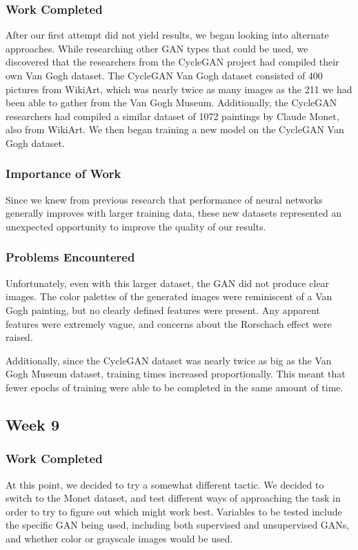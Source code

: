 \documentclass[12pt,letterpaper]{article}
\begin{document}
			\subsubsection{Work Completed}
				After our first attempt did not yield results, we began looking into alternate approaches.
				While researching other GAN types that could be used, we discovered that the researchers from the CycleGAN\cite{CycleGAN2017}\cite{isola2017image} project had compiled their own Van Gogh dataset.
				The CycleGAN Van Gogh dataset consisted of 400 pictures from WikiArt\cite{wikiartVanGogh}, which was nearly twice as many images as the 211 we had been able to gather from the Van Gogh Museum.
				Additionally, the CycleGAN researchers had compiled a similar dataset of 1072 paintings by Claude Monet, also from WikiArt.
				We then began training a new model on the CycleGAN Van Gogh dataset.
			\subsubsection{Importance of Work}
				Since we knew from previous research that performance of neural networks generally improves with larger training data, these new datasets represented an unexpected opportunity to improve the quality of our results.
			\subsubsection{Problems Encountered}
				Unfortunately, even with this larger dataset, the GAN did not produce clear images.
				The color palettes of the generated images were reminiscent of a Van Gogh painting, but no clearly defined features were present.
				Any apparent features were extremely vague, and concerns about the Rorschach effect were raised.

				Additionally, since the CycleGAN dataset was nearly twice as big as the Van Gogh Museum dataset, training times increased proportionally.
				This meant that fewer epochs of training were able to be completed in the same amount of time.

		\subsection{Week 9}
			\subsubsection{Work Completed}
				At this point, we decided to try a somewhat different tactic.
				We decided to switch to the Monet dataset, and test different ways of approaching the task in order to try to figure out which might work best.
				Variables to be tested include the specific GAN being used, including both supervised and unsupervised GANs, and whether color or grayscale images would be used.
\end{document}
